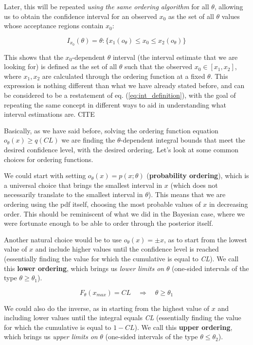 Later, this will be repeated \emph{using the same ordering algorithm} for all $\theta$, allowing us to obtain the confidence interval for an observed $x_0$ as the set of all $\theta$ values whose acceptance regions contain $x_0$:

	\[
	I_{x_0}\left(\theta\right) = \theta: \{x_1(o_{\theta})\leq x_0 \leq x_2(o_{\theta})\} 
	\]

This shows that the $x_0$-dependent $\theta$ interval (the interval estimate that we are looking for) is defined as the set of all $\theta$ such that the observed $x_0\in\left[x_1,x_2\right]$, where $x_1,x_2$ are calculated through the ordering function at a fixed $\theta$. This expression is nothing different than what we have already stated before, and can be considered to be a restatement of eq. (\ref{eq:int_definition}), with the goal of repeating the same concept in different ways to aid in understanding what interval estimations are. CITE

Basically, as we have said before, solving the ordering function equation $o_{\theta}(x)\geq q(CL)$ we are finding the $\theta$-dependent integral bounds that meet the desired confidence level, with the desired ordering. Let's look at some common choices for ordering functions.

We could start with setting $o_{\theta}(x)=p(x;\theta)$ (\textbf{probability ordering}), which is a universal choice that brings the smallest interval in $x$ (which does not necessarily translate to the smallest interval in $\theta$). This means that we are ordering using the pdf itself, choosing the most probable values of $x$ in decreasing order. This should be reminiscent of what we did in the Bayesian case, where we were fortunate enough to be able to order through the posterior itself.

Another natural choice would be to use $o_{\theta}(x)=\pm x$, as to start from the lowest value of $x$ and include higher values until the confidence level is reached (essentially finding the value for which the cumulative is equal to \emph{CL}). We call this \textbf{lower ordering}, which brings us \emph{lower limits on} $\theta$ (one-sided intervals of the type $\theta\geq\theta_1$). 

	\[
	F_{\theta}(x_{max}) = CL \quad \Rightarrow \quad \theta\geq\theta_1
	\]

We could also do the inverse, as in starting from the highest value of $x$ and including lower values until the integral equals \emph{CL} (essentially finding the value for which the cumulative is equal to $1-CL$). We call this \textbf{upper ordering}, which brings us \emph{upper limits on} $\theta$ (one-sided intervals of the type $\theta\leq\theta_2$).

